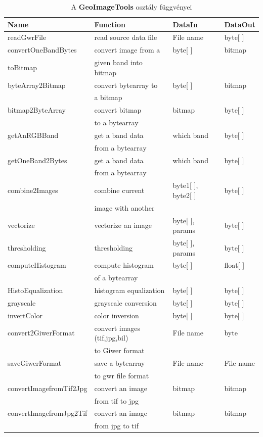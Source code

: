 \documentclass[a4paper,12pt]{article}
\begin{document}
\begin{table}
	\begin{small}	
		\begin{tabular}{|l|l|l|l|}
			\hline
			\textbf{Name} & \textbf{Function} & \textbf{DataIn} & \textbf{DataOut}\\	
			\hline
			readGwrFile & read source data file & File name & byte[ ] \\
				\hline
			convertOneBandBytes & convert image from a  & byte[ ] & bitmap \\
			toBitmap & given band into bitmap & &\\
				\hline
			byteArray2Bitmap & convert bytearray to& byte[ ] & bitmap \\
			&a bitmap & &\\
				\hline
			bitmap2ByteArray & convert bitmap & bitmap & byte[ ] \\
			&  to a bytearray & &\\
				\hline
			getAnRGBBand& get a band data  & which band & byte[ ] \\
			& from a bytearray & &\\
				\hline
			getOneBand2Bytes & get a band data & which band & byte[ ] \\
			& from a bytearray &&\\
				\hline
			combine2Images & combine current  & byte1[ ], byte2[ ] & byte[ ] \\
			&image with another& &\\
				\hline
			vectorize & vectorize an image & byte[ ], params & byte[ ] \\
				\hline
			thresholding & thresholding & byte[ ], params & byte[ ] \\
				\hline
			computeHistogram & compute histogram  & byte[ ] & float[ ] \\
			& of a bytearray & &\\
				\hline
			HistoEqualization & histogram equalization & byte[ ] & byte[ ] \\
				\hline
			grayscale & grayscale conversion & byte[ ] & byte[ ] \\
				\hline
			invertColor & color inversion & byte[ ] & byte[ ] \\
				\hline
			convert2GiwerFormat & convert images (tif,jpg,bil)  & File name & byte\\	
			&to Giwer format & &\\
				\hline
			saveGiwerFormat & save a bytearray  & File name  & File name\\	
			&to gwr file format & &\\
				\hline
			convertImagefromTif2Jpg & convert an image & bitmap&bitmap\\
			& from tif to jpg & &\\
				\hline
			convertImagefromJpg2Tif & convert an image & bitmap&bitmap\\
			& from jpg to tif & &\\	
			\hline
		\end{tabular}
	\end{small}
	\caption{A \textbf{GeoImageTools} osztály függvényei}
	\label{fig:GeoImageTools}
\end{table}
\end{document}

